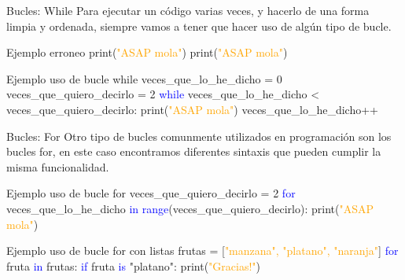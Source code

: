 \documentclass{beamer}
\begin{document}
	\begin{frame}{Bucles: While}
    	Para ejecutar un código varias veces, y hacerlo de una forma limpia y ordenada, siempre vamos a tener que hacer uso de algún tipo de bucle.
    	\begin{Programexample}{Ejemplo erroneo}
    		print(\textcolor{orange}{"ASAP mola"}) \newline
    		print(\textcolor{orange}{"ASAP mola"})
    	\end{Programexample}
    	\begin{Programexample}{Ejemplo uso de bucle while}
    		veces\_que\_lo\_he\_dicho = 0 \newline
    		veces\_que\_quiero\_decirlo = 2 \newline
    		\textcolor{blue}{while} veces\_que\_lo\_he\_dicho < veces\_que\_quiero\_decirlo:
    		\hspace{2cm} print(\textcolor{orange}{"ASAP mola"}) \newline
    		\hspace{2cm} veces\_que\_lo\_he\_dicho++
    	\end{Programexample}
    \end{frame}
    
    \begin{frame}{Bucles: For}
        Otro tipo de bucles comunmente utilizados en programación son los bucles for, en este caso encontramos diferentes sintaxis que pueden cumplir la misma funcionalidad.
        \begin{Programexample}{Ejemplo uso de bucle for}
        	veces\_que\_quiero\_decirlo = 2 \newline
        	\textcolor{blue}{for} veces\_que\_lo\_he\_dicho \textcolor{blue}{in range}(veces\_que\_quiero\_decirlo): \newline
        	\hspace{2cm} print(\textcolor{orange}{"ASAP mola"})
        \end{Programexample}
        \begin{Programexample}{Ejemplo uso de bucle for con listas}
        	frutas = [\textcolor{orange}{"manzana", "platano", "naranja"}] \newline
        	\textcolor{blue}{for} fruta \textcolor{blue}{in} frutas: \newline
        	\textcolor{blue}{if} fruta \textcolor{blue}{is} "platano": \newline
        	\hspace{2cm} print(\textcolor{orange}{"Gracias!"})
        \end{Programexample}
    \end{frame}
        
\end{document}
